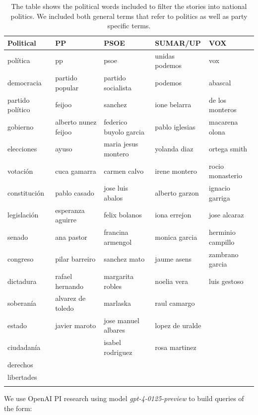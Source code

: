 \documentclass[12pt]{article}
\begin{document}
\begin{longtable}{|l|l|l|l|l|}
	\hline
	\textbf{Political} & \textbf{PP} & \textbf{PSOE} & \textbf{SUMAR/UP} & \textbf{VOX} \\
	\hline
	política & pp & psoe & unidas podemos & vox \\
	democracia & partido popular & partido socialista & podemos & abascal \\
	partido político & feijoo & sanchez & ione belarra &de los monteros \\
	gobierno & alberto nunez feijoo & federico buyolo garcia & pablo iglesias & macarena olona \\
	elecciones & ayuso & maria jesus montero & yolanda diaz & ortega smith \\
	votación & cuca gamarra & carmen calvo & irene montero & rocio monasterio \\
	constitución & pablo casado & jose luis abalos & alberto garzon & ignacio garriga \\
	legislación & esperanza aguirre & felix bolanos & iona errejon &jose alcaraz \\
	senado & ana pastor & francina armengol & monica garcia & herminio campillo \\
	congreso & pilar barreiro & sanchez mato & jaume asens & zambrano garcia \\
	dictadura & rafael hernando & margarita robles & noelia vera & luis gestoso \\
	soberanía &alvarez de toledo & marlaska & raul camargo & \\
	estado & javier maroto & jose manuel albares &lopez de uralde & \\
	ciudadanía &  & isabel rodriguez & rosa martinez & \\
	derechos &  &  &  & \\
	libertades &  &  &  & \\
	\hline
	\caption{The table shows the political words included to filter the stories into national politics. We included both general terms that refer to politics as well as party specific terms.}
	\label{table:politics}
\end{longtable}



We use OpenAI PI research  using model \textit{gpt-4-0125-preview} to build queries of the form: 
\end{document}
